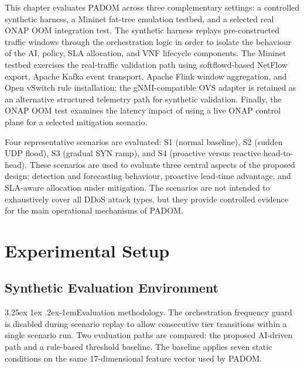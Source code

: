 \documentclass[12pt, a4paper, reqno, oneside]{book}
\makeatletter
\newcommand{\padonap}{\textsc{PADOM}}
\renewcommand\paragraph{\@startsection{paragraph}{5}{\z@}%
  {3.25ex \@plus1ex \@minus.2ex}{-1em}{\normalfont\normalsize\bfseries}}
\makeatother
\begin{document}
This chapter evaluates \padonap{} across three complementary settings:
a controlled synthetic harness, a Mininet fat-tree emulation testbed, and
a selected real ONAP OOM integration test. The synthetic harness replays
pre-constructed traffic windows through the orchestration logic in order to
isolate the behaviour of the AI, policy, SLA allocation, and VNF lifecycle
components. The Mininet testbed exercises the real-traffic validation path
using softflowd-based NetFlow export, Apache Kafka event transport, Apache
Flink window aggregation, and Open vSwitch rule installation; the
gNMI-compatible OVS adapter is retained as an alternative structured telemetry
path for synthetic validation. Finally, the ONAP OOM test examines the latency
impact of using a live ONAP control plane for a selected mitigation scenario.

Four representative scenarios are evaluated: S1 (normal baseline), S2
(sudden UDP flood), S3 (gradual SYN ramp), and S4 (proactive versus reactive
head-to-head). These scenarios are used to evaluate three central aspects of
the proposed design: detection and forecasting behaviour, proactive lead-time
advantage, and SLA-aware allocation under mitigation. The scenarios are not
intended to exhaustively cover all DDoS attack types, but they provide
controlled evidence for the main operational mechanisms of \padonap{}.

\section{Experimental Setup}
\label{sec:implementation}

\subsection{Synthetic Evaluation Environment}

\paragraph{Evaluation methodology.}
The orchestration frequency guard is disabled during scenario replay to allow
consecutive tier transitions within a single scenario run. Two evaluation
paths are compared: the proposed AI-driven path and a rule-based threshold
baseline. The baseline applies seven static conditions on the same
17-dimensional feature vector used by \padonap{}.
\end{document}
